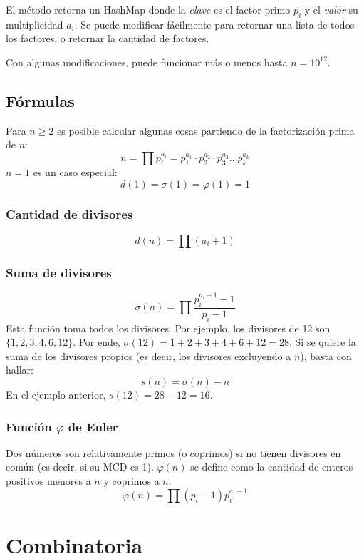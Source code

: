 \documentclass{article}
\begin{document}
\begin{multicols}{2}
	El método retorna un HashMap donde la \emph{clave} es el factor primo \( p_{i} \) y el \emph{valor} su multiplicidad \( a_{i} \). Se puede modificar fácilmente para retornar una lista de todos los factores, o retornar la cantidad de factores.
	
	Con algunas modificaciones, puede funcionar más o menos hasta \( n = 10^{12} \).
	
	
	\subsection{Fórmulas}
	Para \( n \geq 2 \) es posible calcular algunas cosas partiendo de la factorización prima de \( n \):
	\[ n = \prod p_{i}^{a_{i}} = p_{1}^{a_{1}} \cdot p_{2}^{a_{2}} \cdot p_{3}^{a_{3}} ...  p_{k}^{a_{k}} \]
	\( n = 1 \) es un caso especial:
	\[ d(1) = \sigma (1) = \varphi (1) = 1 \]

		\subsubsection{Cantidad de divisores}
		\[ d(n) = \prod (a_{i} + 1) \]
		
		\subsubsection{Suma de divisores}
		\[ 
			\sigma (n) = \prod \frac{p_{i}^{a_{i} + 1} - 1}{p_{i} - 1}
		\]
		Esta función toma todos los divisores. Por ejemplo, los divisores de 12 son \( \{1, 2, 3, 4, 6, 12\} \). Por ende, \( \sigma(12) = 1+2+3+4+6+12 = 28 \). Si se quiere la suma de los divisores propios (es decir, los divisores excluyendo a \( n \)), basta con hallar:
		\[ 
			s (n) = \sigma (n) - n
		\]		
		En el ejemplo anterior, \( s (12) = 28-12 = 16 \).
		
		\subsubsection{Función $\varphi$ de Euler}
		Dos números son relativamente primos (o coprimos) si no tienen divisores en común (es decir, si su MCD es 1). \( \varphi (n) \) se define como la cantidad de enteros positivos menores a \( n \) y coprimos a \( n \). 
		\[ 
			\varphi (n) = \prod (p_{i} - 1) p_{i}^{a_{i}-1}
		\]

\section{Combinatoria}


\end{multicols}
\end{document}
